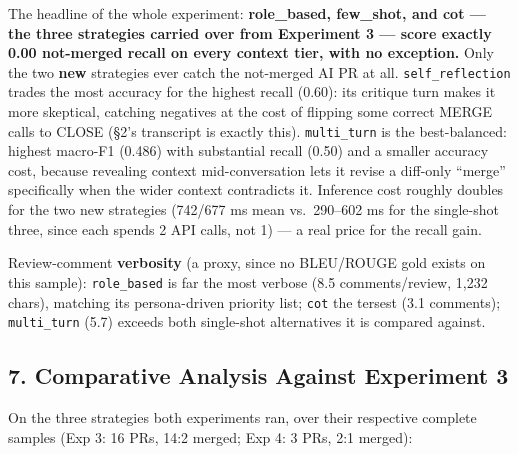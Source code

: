 \documentclass{experimentreport}
\begin{document}
{\noindent The headline of the whole experiment: \textbf{role\_based, few\_shot, and cot --- the three
strategies carried over from Experiment 3 --- score exactly 0.00 not-merged recall on every context
tier, with no exception.} Only the two \textbf{new} strategies ever catch the not-merged AI PR at
all. \texttt{self\_reflection} trades the most accuracy for the highest recall (0.60): its critique
turn makes it more skeptical, catching negatives at the cost of flipping some correct MERGE calls to
CLOSE (\S2's transcript is exactly this). \texttt{multi\_turn} is the best-balanced: highest
macro-F1 (0.486) with substantial recall (0.50) and a smaller accuracy cost, because revealing
context mid-conversation lets it revise a diff-only ``merge'' specifically when the wider context
contradicts it. Inference cost roughly doubles for the two new strategies (742/677 ms mean vs.\
290--602 ms for the single-shot three, since each spends 2 API calls, not 1) --- a real price for
the recall gain.

\medskip
\noindent Review-comment \textbf{verbosity} (a proxy, since no BLEU/ROUGE gold exists on this
sample): \texttt{role\_based} is far the most verbose (8.5 comments/review, 1{,}232 chars), matching
its persona-driven priority list; \texttt{cot} the tersest (3.1 comments); \texttt{multi\_turn} (5.7)
exceeds both single-shot alternatives it is compared against.

\subsection*{7. Comparative Analysis Against Experiment 3}

On the three strategies both experiments ran, over their respective complete samples (Exp 3: 16 PRs,
14:2 merged; Exp 4: 3 PRs, 2:1 merged):

}
\end{document}
